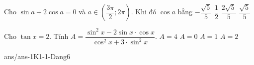\begin{ex}%
	Cho $\sin a +2\cos a =0$  và $a\in\left(\dfrac{3\pi}{2};2\pi\right)$. Khi đó $\cos a$  bằng
	\choice
	{\True $ - \dfrac{{\sqrt 5 }}{5}$}
	{$\dfrac{1}{2}$}
	{$\dfrac{{2\sqrt 5 }}{5}$}
	{ $\dfrac{{\sqrt 5 }}{5}$}
\end{ex}
\begin{ex}%
	Cho $ \tan x = 2 $. Tính $ A = \dfrac{{\sin^2}x - 2\sin x\cdot\cos x}{{\cos^2}x + 3\cdot{\sin^2}x} $.
	\choice
	{$A = 4$}
	{\True$A = 0$}
	{$A = 1$}
	{$A = 2$}
\end{ex}

\begin{indapan}{10}
	{ans/ans-1K1-1-Dang6}
\end{indapan}

